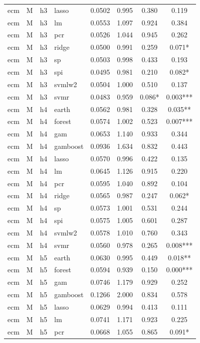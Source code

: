\begin{ThreePartTable}
\begin{longtable}[t]{llclcccc}
ecm & M & h3 & lasso & 0.0502 & 0.995 & 0.380 & 0.119\\
ecm & M & h3 & lm & 0.0553 & 1.097 & 0.924 & 0.384\\
ecm & M & h3 & pcr & 0.0526 & 1.044 & 0.945 & 0.262\\
ecm & M & h3 & ridge & 0.0500 & 0.991 & 0.259 & 0.071*\\
ecm & M & h3 & sp & 0.0503 & 0.998 & 0.433 & 0.193\\
ecm & M & h3 & spi & 0.0495 & 0.981 & 0.210 & 0.082*\\
ecm & M & h3 & svmlw2 & 0.0504 & 1.000 & 0.510 & 0.137\\
ecm & M & h3 & svmr & 0.0483 & 0.959 & 0.086* & 0.003***\\
\addlinespace
ecm & M & h4 & earth & 0.0562 & 0.981 & 0.328 & 0.035**\\
ecm & M & h4 & forest & 0.0574 & 1.002 & 0.523 & 0.007***\\
ecm & M & h4 & gam & 0.0653 & 1.140 & 0.933 & 0.344\\
ecm & M & h4 & gamboost & 0.0936 & 1.634 & 0.832 & 0.443\\
ecm & M & h4 & lasso & 0.0570 & 0.996 & 0.422 & 0.135\\
ecm & M & h4 & lm & 0.0645 & 1.126 & 0.915 & 0.220\\
ecm & M & h4 & pcr & 0.0595 & 1.040 & 0.892 & 0.104\\
ecm & M & h4 & ridge & 0.0565 & 0.987 & 0.247 & 0.062*\\
ecm & M & h4 & sp & 0.0573 & 1.001 & 0.531 & 0.244\\
ecm & M & h4 & spi & 0.0575 & 1.005 & 0.601 & 0.287\\
ecm & M & h4 & svmlw2 & 0.0578 & 1.010 & 0.760 & 0.343\\
ecm & M & h4 & svmr & 0.0560 & 0.978 & 0.265 & 0.008***\\
\addlinespace
ecm & M & h5 & earth & 0.0630 & 0.995 & 0.449 & 0.018**\\
ecm & M & h5 & forest & 0.0594 & 0.939 & 0.150 & 0.000***\\
ecm & M & h5 & gam & 0.0746 & 1.179 & 0.929 & 0.252\\
ecm & M & h5 & gamboost & 0.1266 & 2.000 & 0.834 & 0.578\\
ecm & M & h5 & lasso & 0.0629 & 0.994 & 0.413 & 0.111\\
ecm & M & h5 & lm & 0.0741 & 1.171 & 0.923 & 0.225\\
ecm & M & h5 & pcr & 0.0668 & 1.055 & 0.865 & 0.091*\\

\end{longtable}
\end{ThreePartTable}
